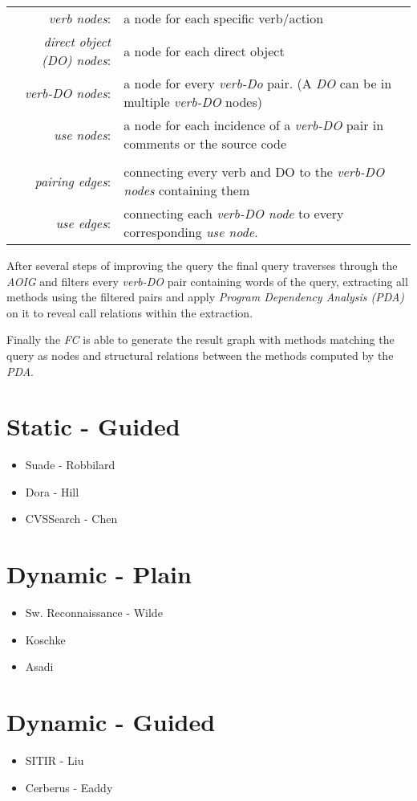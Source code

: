 \begin{table}[th]
	\begin{tabular}{r l}
		\textit{verb nodes}: & a node for each specific verb/action \\
		\textit{direct object (DO) nodes}: & a node for each direct object \\
		\textit{verb-DO nodes}: & a node for every \textit{verb-Do} pair. (A \textit{DO} can be in multiple \textit{verb-DO} nodes) \\
		\textit{use nodes}: & a node for each incidence of a \textit{verb-DO} pair in comments or the source code \\
		 & \\
		\textit{pairing edges}: & connecting every verb and DO to the \textit{verb-DO nodes} containing them \\
		\textit{use edges}: & connecting each \textit{verb-DO node} to every corresponding \textit{use node}.
	\end{tabular}
\end{table}

After several steps of improving the query the final query traverses through the \textit{AOIG} and filters every \textit{verb-DO} pair containing words of the query, extracting all methods using the filtered pairs and apply  \textit{Program Dependency Analysis (PDA)} on it to reveal call relations within the extraction.

Finally the \emph{FC} is able to generate the result graph with methods matching the query as nodes and structural relations between the methods computed by the \textit{PDA}. \cite{shepherd2007using} 




\section{Static - Guided}
\begin{itemize}
\item Suade - Robbilard
\item Dora - Hill
\item  CVSSearch - Chen
\end{itemize}

\section{Dynamic - Plain}
\begin{itemize}
\item Sw. Reconnaissance - Wilde
\item Koschke
\item Asadi
\end{itemize}

\section{Dynamic - Guided}
\begin{itemize}
\item SITIR - Liu
\item Cerberus - Eaddy
\end{itemize}


